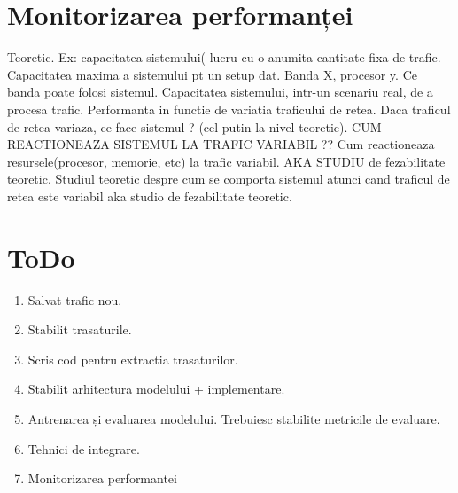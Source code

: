 \documentclass[12pt, a4paper, twoside, romanian]{teza-upb}
\begin{document}
    \chapter{Monitorizarea performanței}
        Teoretic. Ex: capacitatea sistemului( lucru cu o anumita cantitate fixa de trafic. Capacitatea maxima a sistemului pt un setup dat. Banda X, procesor y. Ce banda poate folosi sistemul.  Capacitatea sistemului, intr-un scenariu real, de a procesa trafic. Performanta in functie de variatia traficului de retea. Daca traficul de retea variaza, ce face sistemul ? (cel putin la nivel teoretic). CUM REACTIONEAZA SISTEMUL LA TRAFIC VARIABIL ?? Cum reactioneaza resursele(procesor, memorie, etc) la trafic variabil. AKA STUDIU de fezabilitate teoretic.
        Studiul teoretic despre cum se comporta sistemul atunci cand traficul de retea este variabil aka studio de fezabilitate teoretic.

    \chapter{ToDo}
    \begin{enumerate}
        \item Salvat trafic nou.
        \item Stabilit trasaturile.
        \item Scris cod pentru extractia trasaturilor.
        \item Stabilit arhitectura modelului + implementare.
        \item Antrenarea și evaluarea modelului. Trebuiesc stabilite metricile de evaluare.
        \item Tehnici de integrare.
        \item Monitorizarea performantei
    \end{enumerate}
\end{document}
